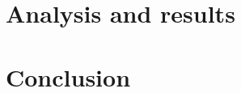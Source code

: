 \documentclass[a4paper,12pt,openright,twoside,unknownkeysallowed]{book}
\begin{document}
\part{Analysis and results}
	
	
\part{Conclusion}
	

\backmatter
\printbibliography[heading=bibintoc]






\end{document}
